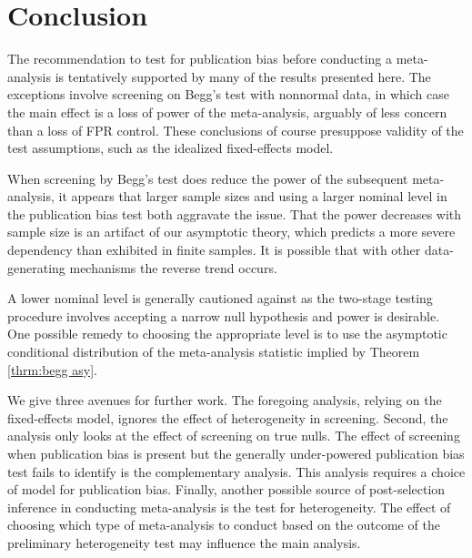 \documentclass[12pt]{article}
\begin{document}
\section {Conclusion}
\label{sec:conclusion}

The recommendation to test for publication bias before conducting a
meta-analysis is tentatively supported by many of the results presented here. The
exceptions involve screening on Begg's test with nonnormal data, in
which case the main effect is a loss of power of the meta-analysis,
arguably of less concern than a loss of FPR control. These conclusions
of course presuppose validity of the test assumptions, such as the
idealized fixed-effects model.

When screening by Begg's test does reduce the power of the subsequent
meta-analysis, it appears that larger sample sizes and using a larger
nominal level in the publication bias test both aggravate the issue.
That the power decreases with sample size is an artifact of our
asymptotic theory, which predicts a more severe dependency than
exhibited in finite samples. It is possible that with other
data-generating mechanisms the reverse trend occurs.

A lower nominal level is generally cautioned against as the two-stage
testing procedure involves accepting a narrow null hypothesis and
power is desirable. One possible remedy to choosing the appropriate
level is to use the asymptotic conditional distribution of the
meta-analysis statistic implied by Theorem \ref{thrm:begg asy}.

We give three avenues for further work. The foregoing analysis,
relying on the fixed-effects model, ignores the effect of
heterogeneity in screening. Second, the analysis only looks at the
effect of screening on true nulls. The effect of screening when
publication bias is present but the generally under-powered
publication bias test fails to identify is the complementary
analysis. This analysis requires a choice of model for publication
bias. Finally, another possible source of post-selection inference in
conducting meta-analysis is the test for heterogeneity. The effect of
choosing which type of meta-analysis to conduct based on the outcome
of the preliminary heterogeneity test may influence the main analysis.




\end{document}

